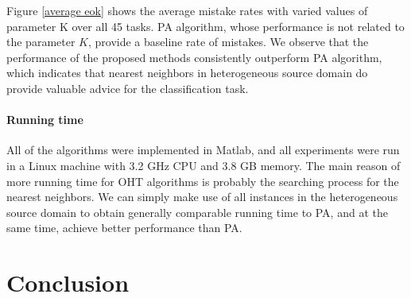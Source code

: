 \documentclass[letterpaper]{article}
\begin{document}
Figure \ref{average eok} shows the average mistake rates with varied values of parameter K over all 45 tasks.
PA algorithm, whose performance is not related to the parameter $K$, provide a baseline rate of mistakes.
We observe that the performance of the proposed methods consistently outperform PA algorithm, which indicates that nearest neighbors in heterogeneous source domain do provide valuable advice for the classification task.

\paragraph{Running time}
All of the algorithms were implemented in Matlab, and all experiments were run in a Linux machine with 3.2 GHz CPU and 3.8 GB memory.
The main reason of more running time for OHT algorithms is probably the searching process for the nearest neighbors.
We can simply make use of all instances in the heterogeneous source domain to obtain generally comparable running time to PA, and at the same time, achieve better performance than PA.

\section{Conclusion}
\end{document}
